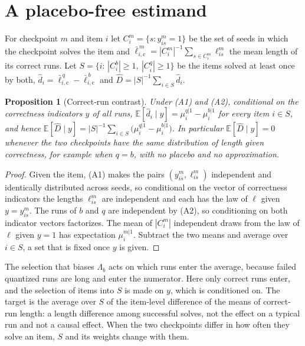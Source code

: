 \documentclass[11pt,a4paper]{article}
\newtheorem{proposition}{Proposition}
\begin{document}
\section{A placebo-free estimand}
\label{app:crd}
For checkpoint $m$ and item $i$ let $C^m_i=\{s:y^m_{is}=1\}$ be the set of seeds in which the checkpoint solves the item and $\bar\ell^{\,m}_{i,\mathrm{c}}=|C^m_i|^{-1}\sum_{s\in C^m_i}\ell^m_{is}$ the mean length of its correct runs. Let $S=\{i:\,|C^b_i|\ge1,\ |C^q_i|\ge1\}$ be the items solved at least once by both, $\hat d_i=\bar\ell^{\,q}_{i,\mathrm{c}}-\bar\ell^{\,b}_{i,\mathrm{c}}$ and $\widehat D=|S|^{-1}\sum_{i\in S}\hat d_i$.

\begin{proposition}[Correct-run contrast]
\label{prop:crd}
Under (A1) and (A2), conditional on the correctness indicators $y$ of all runs, $\mathbb{E}[\hat d_i\mid y]=\mu^{q|1}_i-\mu^{b|1}_i$ for every item $i\in S$, and hence $\mathbb{E}[\widehat D\mid y]=|S|^{-1}\sum_{i\in S}\big(\mu^{q|1}_i-\mu^{b|1}_i\big)$. In particular $\mathbb{E}[\widehat D\mid y]=0$ whenever the two checkpoints have the same distribution of length given correctness, for example when $q=b$, with no placebo and no approximation.
\end{proposition}

\begin{proof}
Given the item, (A1) makes the pairs $(y^m_{is},\ell^m_{is})$ independent and identically distributed across seeds, so conditional on the vector of correctness indicators the lengths $\ell^m_{is}$ are independent and each has the law of $\ell$ given $y=y^m_{is}$. The runs of $b$ and $q$ are independent by (A2), so conditioning on both indicator vectors factorizes. The mean of $|C^m_i|$ independent draws from the law of $\ell$ given $y=1$ has expectation $\mu^{m|1}_i$. Subtract the two means and average over $i\in S$, a set that is fixed once $y$ is given.
\end{proof}

The selection that biases $\Lambda_b$ acts on which runs enter the average, because failed quantized runs are long and enter the numerator. Here only correct runs enter, and the selection of items into $S$ is made on $y$, which is conditioned on. The target is the average over $S$ of the item-level difference of the means of correct-run length: a length difference among successful solves, not the effect on a typical run and not a causal effect. When the two checkpoints differ in how often they solve an item, $S$ and its weights change with them.
\end{document}
